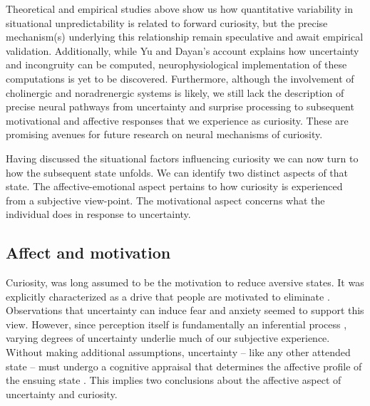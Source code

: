 Theoretical and empirical studies above show us how quantitative variability in situational unpredictability is related to forward curiosity, but the precise mechanism(s) underlying this relationship remain speculative and await empirical validation. Additionally, while Yu and Dayan's account explains how uncertainty and incongruity can be computed, neurophysiological implementation of these computations is yet to be discovered. Furthermore, although the involvement of cholinergic and noradrenergic systems is likely, we still lack the description of precise neural pathways from uncertainty and surprise processing to subsequent motivational and affective responses that we experience as curiosity. These are promising avenues for future research on neural mechanisms of curiosity.



Having discussed the situational factors influencing curiosity we can now turn to how the subsequent state unfolds. We can identify two distinct aspects of that state. The affective-emotional aspect pertains to how curiosity is experienced from a subjective view-point. The motivational aspect concerns what the individual does in response to uncertainty.

\subsection{Affect and motivation}\label{CH2_SS_affect_and_motivation} 

Curiosity, was long assumed to be the motivation to reduce aversive states. It was explicitly characterized as a drive that people are motivated to eliminate \parencite{berlyne_theory_1954,loewenstein_psychology_1994}. Observations that uncertainty can induce fear and anxiety \parencite{hebb_organization_2002,carleton_fear_2016} seemed to support this view. However, since perception itself is fundamentally an inferential process \parencite{olshausen_perception_2013,friston_active_2016}, varying degrees of uncertainty underlie much of our subjective experience. Without making additional assumptions, uncertainty --  like any other attended state -- must undergo a cognitive appraisal that determines the affective profile of the ensuing state \parencite{anderson_relationship_2019}. This implies two conclusions about the affective aspect of uncertainty and curiosity.


